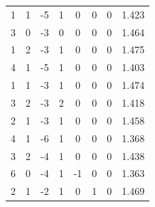 \documentclass[a4paper, 12pt]{article}
\begin{document}
\begin{table}[H]
\begin{tabular}{@{}cccccccc@{}}
    1                      & 1                      & -5                     & 1                      & 0                 & 0                 & 0                 & 1.423               \\
    3                      & 0                      & -3                     & 0                      & 0                 & 0                 & 0                 & 1.464               \\
    1                      & 2                      & -3                     & 1                      & 0                 & 0                 & 0                 & 1.475               \\
    4                      & 1                      & -5                     & 1                      & 0                 & 0                 & 0                 & 1.403               \\
    1                      & 1                      & -3                     & 1                      & 0                 & 0                 & 0                 & 1.474               \\
    3                      & 2                      & -3                     & 2                      & 0                 & 0                 & 0                 & 1.418               \\
    2                      & 1                      & -3                     & 1                      & 0                 & 0                 & 0                 & 1.458               \\
    4                      & 1                      & -6                     & 1                      & 0                 & 0                 & 0                 & 1.368               \\
    3                      & 2                      & -4                     & 1                      & 0                 & 0                 & 0                 & 1.438               \\
    6                      & 0                      & -4                     & 1                      & -1                & 0                 & 0                 & 1.363               \\
    2                      & 1                      & -2                     & 1                      & 0                 & 1                 & 0                 & 1.469               \\ \bottomrule
    \end{tabular}
    \end{table}
\end{document}
